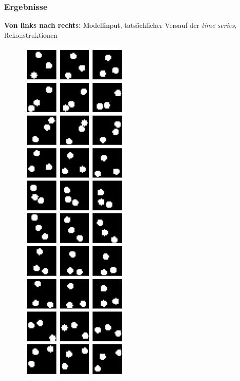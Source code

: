 \begin{frame}
\begin{figure}[h!]
\begin{minipage}{0.33\textwidth}
	\end{minipage}
\end{figure}
\end{frame}




\begin{frame}
\frametitle{Ergebnisse}
\textbf{Von links nach rechts:} Modellinput, tatsächlicher Versauf der \emph{time series}, Rekonstruktionen 
\begin{figure}[h!]
	\begin{minipage}{0.135\textwidth}
		\center{}
		\includegraphics[scale=0.19]{Bilder/bouncingBalls_ODEorig1}

\end{minipage}
\end{figure}
\end{frame}
